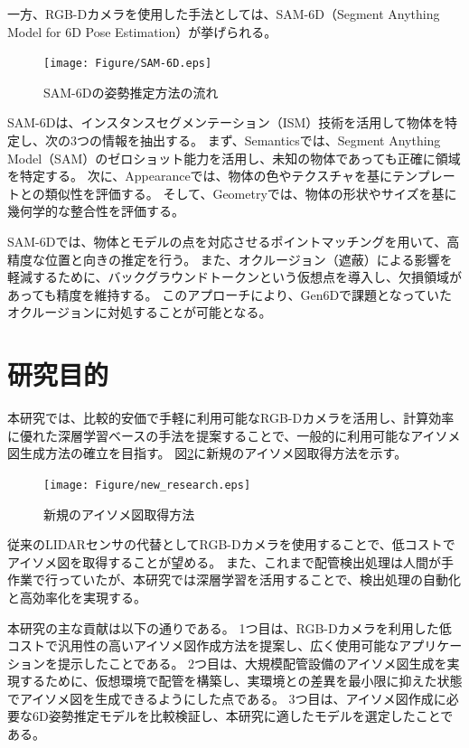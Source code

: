 一方、RGB-Dカメラを使用した手法としては、SAM-6D（Segment Anything Model for 6D Pose Estimation）が挙げられる。
\begin{figure}[htbt]
	\centering
	 \texttt{[image: Figure/SAM-6D.eps]}
	 \caption{SAM-6Dの姿勢推定方法の流れ}
	 \label{fig:f7}
\end{figure}

SAM-6Dは、インスタンスセグメンテーション（ISM）技術を活用して物体を特定し、次の3つの情報を抽出する。
まず、Semanticsでは、Segment Anything Model（SAM）のゼロショット能力を活用し、未知の物体であっても正確に領域を特定する。
次に、Appearanceでは、物体の色やテクスチャを基にテンプレートとの類似性を評価する。
そして、Geometryでは、物体の形状やサイズを基に幾何学的な整合性を評価する。

SAM-6Dでは、物体とモデルの点を対応させるポイントマッチングを用いて、高精度な位置と向きの推定を行う。
また、オクルージョン（遮蔽）による影響を軽減するために、バックグラウンドトークンという仮想点を導入し、欠損領域があっても精度を維持する。
このアプローチにより、Gen6Dで課題となっていたオクルージョンに対処することが可能となる。


\section{研究目的}
本研究では、比較的安価で手軽に利用可能なRGB-Dカメラを活用し、計算効率に優れた深層学習ベースの手法を提案することで、一般的に利用可能なアイソメ図生成方法の確立を目指す。
図\ref{fig:f8}に新規のアイソメ図取得方法を示す。\\
\begin{figure}[htbt]
	\centering
	 \texttt{[image: Figure/new\_research.eps]}
	 \caption{新規のアイソメ図取得方法}
	 \label{fig:f8}
\end{figure}

従来のLIDARセンサの代替としてRGB-Dカメラを使用することで、低コストでアイソメ図を取得することが望める。
また、これまで配管検出処理は人間が手作業で行っていたが、本研究では深層学習を活用することで、検出処理の自動化と高効率化を実現する。

本研究の主な貢献は以下の通りである。
1つ目は、RGB-Dカメラを利用した低コストで汎用性の高いアイソメ図作成方法を提案し、広く使用可能なアプリケーションを提示したことである。
2つ目は、大規模配管設備のアイソメ図生成を実現するために、仮想環境で配管を構築し、実環境との差異を最小限に抑えた状態でアイソメ図を生成できるようにした点である。
3つ目は、アイソメ図作成に必要な6D姿勢推定モデルを比較検証し、本研究に適したモデルを選定したことである。


